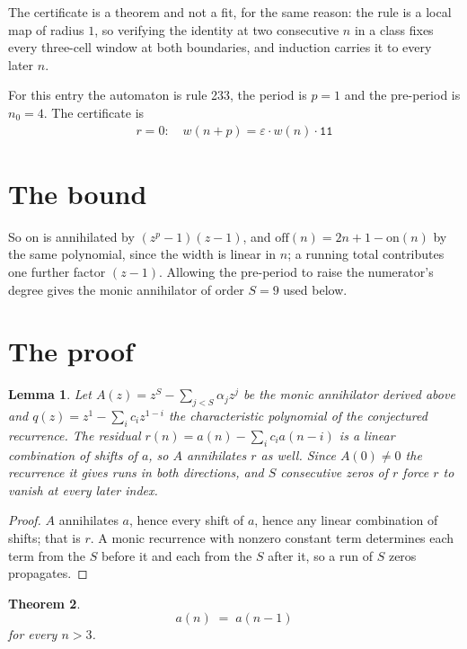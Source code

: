 \documentclass[11pt,a4paper]{article}
\theoremstyle{plain}
\newtheorem{theorem}{Theorem}
\newtheorem{lemma}[theorem]{Lemma}
\theoremstyle{definition}
\begin{document}
The certificate is a theorem and not a fit, for the same reason: the rule is a local map of
radius $1$, so verifying the identity at two consecutive $n$ in a class fixes every three-cell
window at both boundaries, and induction carries it to every later $n$.

For this entry the automaton is rule 233, the period is $p=1$ and the pre-period is $n_0=4$.
The certificate is
\begin{gather*}
r=0:\quad w(n+p) = \varepsilon \cdot w(n) \cdot \texttt{11}
\end{gather*}

\section{The bound}

So
$\mathrm{on}$ is annihilated by $(z^p-1)(z-1)$, and $\mathrm{off}(n)=2n+1-\mathrm{on}(n)$ by
the same polynomial, since the width is linear in $n$; a running total contributes one further
factor $(z-1)$. Allowing the pre-period to raise the numerator's degree gives the monic
annihilator of order $S=9$ used below.

\section{The proof}

\begin{lemma}\label{lem:crit}
Let $A(z)=z^S-\sum_{j<S}\alpha_jz^{j}$ be the monic annihilator derived above and
$q(z)=z^{1}-\sum_ic_iz^{1-i}$ the characteristic polynomial of the conjectured
recurrence. The residual $r(n)=a(n)-\sum_ic_ia(n-i)$ is a linear combination of shifts of $a$,
so $A$ annihilates $r$ as well. Since $A(0)\ne0$ the recurrence it gives runs in both
directions, and $S$ consecutive zeros of $r$ force $r$ to vanish at every later index.
\end{lemma}

\begin{proof}
$A$ annihilates $a$, hence every shift of $a$, hence any linear combination of shifts; that is
$r$. A monic recurrence with nonzero constant term determines each term from the $S$ before it
and each from the $S$ after it, so a run of $S$ zeros propagates.
\end{proof}

\begin{theorem}
\[
a(n)\;=\;a(n-1)
\]
for every $n>3$.
\end{theorem}
\end{document}
